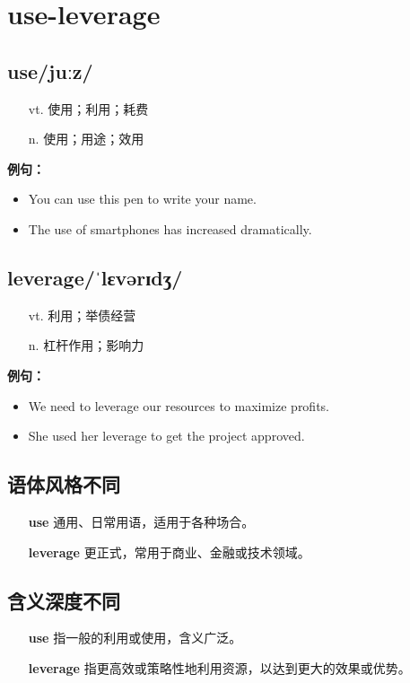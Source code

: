 \documentclass[12pt]{article}
\begin{document}
\section*{use-leverage}
\begin{multicols}{2}
\subsection*{\textbf{use}\quad/juːz/}
\begin{itemize}[leftmargin=2em]
\item[vt.] 使用；利用；耗费
\item[n.] 使用；用途；效用
\end{itemize}
\textbf{例句：}
\begin{itemize}[leftmargin=2em]
\item You can use this pen to write your name.
\item The use of smartphones has increased dramatically.
\end{itemize}
\subsection*{\textbf{leverage}\quad/ˈlɛvərɪdʒ/}
\begin{itemize}[leftmargin=2em]
\item[vt.] 利用；举债经营
\item[n.] 杠杆作用；影响力
\end{itemize}
\textbf{例句：}
\begin{itemize}[leftmargin=2em]
\item We need to leverage our resources to maximize profits.
\item She used her leverage to get the project approved.
\end{itemize}
\end{multicols}
\subsection*{语体风格不同}
\begin{itemize}
\item[\textbf{use}] 通用、日常用语，适用于各种场合。
\item[\textbf{leverage}] 更正式，常用于商业、金融或技术领域。
\end{itemize}
\subsection*{含义深度不同}
\begin{itemize}
\item[\textbf{use}] 指一般的利用或使用，含义广泛。
\item[\textbf{leverage}] 指更高效或策略性地利用资源，以达到更大的效果或优势。
\end{itemize}
\end{document}
